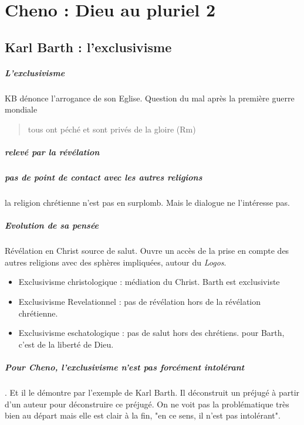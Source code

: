 \chapter{Cheno : Dieu au pluriel 2}


\section{Karl Barth : l'exclusivisme}
 

\paragraph{L'exclusivisme} KB dénonce l'arrogance de son Eglise. Question du mal après la première guerre mondiale
\begin{quote}
    tous ont péché et sont privés de la gloire (Rm)
\end{quote}

\paragraph{relevé par la révélation}

\paragraph{pas de point de contact avec les autres religions} la religion chrétienne n'est pas en surplomb. Mais le dialogue ne l'intéresse pas.

\paragraph{Evolution de sa pensée} Révélation en Christ source de salut. Ouvre un accès de la prise en compte des autres religions avec des sphères impliquées, autour du \textit{Logos}. 


\begin{itemize}
    \item Exclusivisme christologique : médiation du Christ. Barth est exclusiviste 
    \item Exclusivisme Revelationnel : pas de révélation hors de la révélation chrétienne. 
    \item Exclusivisme eschatologique : pas de salut hors des chrétiens. pour Barth, c'est de la liberté de Dieu.
\end{itemize}

\paragraph{Pour Cheno, l'exclusivisme n'est pas forcément intolérant}. Et il le démontre par l'exemple de Karl Barth. Il déconstruit un préjugé à partir d'un auteur pour déconstruire ce préjugé.
On ne voit pas la problématique très bien au départ mais elle est clair à la fin, "en ce sens, il n'est pas intolérant".

